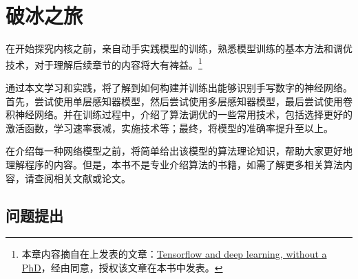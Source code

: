 \begin{savequote}[45mm]
\end{savequote}

\chapter{破冰之旅} 
\label{ch:ice-breaker}

\begin{content}

在开始探究\tf{}内核之前，亲自动手实践模型的训练，熟悉模型训练的基本方法和调优技术，对于理解后续章节的内容将大有裨益。\footnote{ 本章内容摘自在上发表的文章：\href{https://codelabs.developers.google.com/codelabs/cloud-tensorflow-mnist}{Tensorflow and deep learning, without a PhD}，经由同意，授权该文章在本书中发表。}

通过本文学习和实践，将了解到如何构建并训练出能够识别手写数字的神经网络。首先，尝试使用单层感知器模型，然后尝试使用多层感知器模型，最后尝试使用卷积神经网络。并在训练过程中，介绍了算法调优的一些常用技术，包括选择更好的激活函数，学习速率衰减，实施技术等；最终，将模型的准确率提升至以上。

在介绍每一种网络模型之前，将简单给出该模型的算法理论知识，帮助大家更好地理解程序的内容。但是，本书不是专业介绍算法的书籍，如需了解更多相关算法内容，请查阅相关文献或论文。

\end{content}

\section{问题提出}


